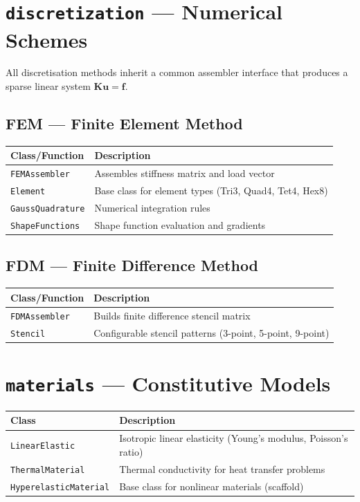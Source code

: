 \documentclass[11pt,a4paper]{report}
\begin{document}
\section{\texttt{discretization} --- Numerical Schemes}

All discretisation methods inherit a common assembler interface that produces a sparse linear system $\mathbf{K}\mathbf{u} = \mathbf{f}$.

\subsection{FEM --- Finite Element Method}

\begin{longtable}{lp{9cm}}
\toprule
\textbf{Class/Function} & \textbf{Description} \\
\midrule
\texttt{FEMAssembler} & Assembles stiffness matrix and load vector \\
\texttt{Element} & Base class for element types (Tri3, Quad4, Tet4, Hex8) \\
\texttt{GaussQuadrature} & Numerical integration rules \\
\texttt{ShapeFunctions} & Shape function evaluation and gradients \\
\bottomrule
\end{longtable}

\subsection{FDM --- Finite Difference Method}

\begin{longtable}{lp{9cm}}
\toprule
\textbf{Class/Function} & \textbf{Description} \\
\midrule
\texttt{FDMAssembler} & Builds finite difference stencil matrix \\
\texttt{Stencil} & Configurable stencil patterns (3-point, 5-point, 9-point) \\
\bottomrule
\end{longtable}

\section{\texttt{materials} --- Constitutive Models}

\begin{longtable}{lp{9cm}}
\toprule
\textbf{Class} & \textbf{Description} \\
\midrule
\texttt{LinearElastic} & Isotropic linear elasticity (Young's modulus, Poisson's ratio) \\
\texttt{ThermalMaterial} & Thermal conductivity for heat transfer problems \\
\texttt{HyperelasticMaterial} & Base class for nonlinear materials (scaffold) \\
\bottomrule
\end{longtable}
\end{document}
